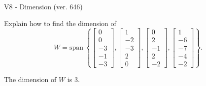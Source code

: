 \begin{exercise}
  \begin{exerciseTitle}V8 - Dimension (ver. 646)\end{exerciseTitle}
  \begin{exerciseStatement}
    Explain how to find the dimension of 
\[W=\mathrm{span}\ \left\{\left[\begin{array}{r}
0 \\
0 \\
-3 \\
-1 \\
-3
\end{array}\right] , \left[\begin{array}{r}
1 \\
-2 \\
-3 \\
2 \\
0
\end{array}\right] , \left[\begin{array}{r}
0 \\
2 \\
-1 \\
2 \\
-2
\end{array}\right] , \left[\begin{array}{r}
1 \\
-6 \\
-7 \\
-4 \\
-2
\end{array}\right]\right\}.\]



  \end{exerciseStatement}
  \begin{exerciseAnswer}
   The dimension of \(W\) is  \(3\).
  


  \end{exerciseAnswer}
\end{exercise}